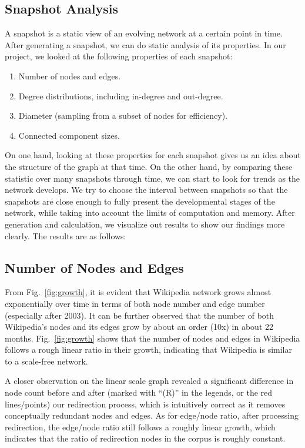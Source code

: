 \documentclass[10pt]{article}
\begin{document}
\begin{multicols}{2}
\section{Snapshot Analysis}
\vspace{10pt}

A snapshot is a static view of an evolving network at a certain point in time. After generating a snapshot, we can do static analysis of its properties. In our project, we looked at the following properties of each snapshot:
\begin{enumerate}
\item Number of nodes and edges.
\item Degree distributions, including in-degree and out-degree.
\item Diameter (sampling from a subset of nodes for efficiency).
\item Connected component sizes.
\end{enumerate}

On one hand, looking at these properties for each snapshot gives us an idea about the structure of the graph at that time. On the other hand, by comparing these statistic over many snapshots through time, we can start to look for trends as the network develops. We try to choose the interval between snapshots so that the snapshots are close enough to fully present the developmental stages of the network, while taking into account the limits of computation and memory. After generation and calculation, we visualize out results to show our findings more clearly. The results are as follows:

\subsection{Number of Nodes and Edges}
From Fig.~\ref{fig:growth}, it is evident that Wikipedia network grows almost exponentially over time in terms of both node number and edge number (especially after 2003). It can be further observed that the number of both Wikipedia's nodes and its edges grow by about an order (10x) in about 22 months. Fig.~\ref{fig:growth} shows that the number of nodes and edges in Wikipedia follows a rough linear ratio in their growth, indicating that Wikipedia is similar to a scale-free network. 

A closer observation on the linear scale graph revealed a significant difference in node count before and after (marked with ``(R)'' in the legends, or the red lines/points) our redirection process, which is intuitively correct as it removes conceptually redundant nodes and edges. As for edge/node ratio, after processing redirection, the edge/node ratio still follows a roughly linear growth, which indicates that the ratio of redirection nodes in the corpus is roughly constant.


\end{multicols}
\end{document}
